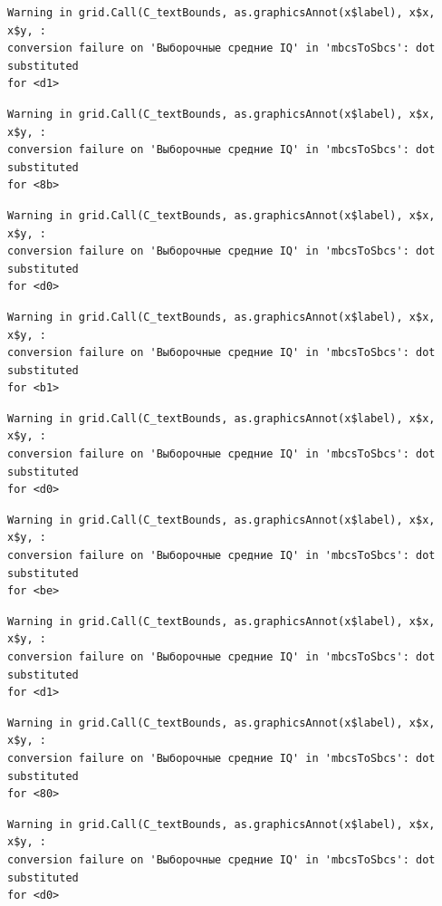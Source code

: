 \documentclass[
  letterpaper,
  DIV=11,
  numbers=noendperiod]{scrreprt}
\theoremstyle{definition}
\theoremstyle{remark}
\begin{document}
\begin{verbatim}
Warning in grid.Call(C_textBounds, as.graphicsAnnot(x$label), x$x, x$y, :
conversion failure on 'Выборочные средние IQ' in 'mbcsToSbcs': dot substituted
for <d1>
\end{verbatim}

\begin{verbatim}
Warning in grid.Call(C_textBounds, as.graphicsAnnot(x$label), x$x, x$y, :
conversion failure on 'Выборочные средние IQ' in 'mbcsToSbcs': dot substituted
for <8b>
\end{verbatim}

\begin{verbatim}
Warning in grid.Call(C_textBounds, as.graphicsAnnot(x$label), x$x, x$y, :
conversion failure on 'Выборочные средние IQ' in 'mbcsToSbcs': dot substituted
for <d0>
\end{verbatim}

\begin{verbatim}
Warning in grid.Call(C_textBounds, as.graphicsAnnot(x$label), x$x, x$y, :
conversion failure on 'Выборочные средние IQ' in 'mbcsToSbcs': dot substituted
for <b1>
\end{verbatim}

\begin{verbatim}
Warning in grid.Call(C_textBounds, as.graphicsAnnot(x$label), x$x, x$y, :
conversion failure on 'Выборочные средние IQ' in 'mbcsToSbcs': dot substituted
for <d0>
\end{verbatim}

\begin{verbatim}
Warning in grid.Call(C_textBounds, as.graphicsAnnot(x$label), x$x, x$y, :
conversion failure on 'Выборочные средние IQ' in 'mbcsToSbcs': dot substituted
for <be>
\end{verbatim}

\begin{verbatim}
Warning in grid.Call(C_textBounds, as.graphicsAnnot(x$label), x$x, x$y, :
conversion failure on 'Выборочные средние IQ' in 'mbcsToSbcs': dot substituted
for <d1>
\end{verbatim}

\begin{verbatim}
Warning in grid.Call(C_textBounds, as.graphicsAnnot(x$label), x$x, x$y, :
conversion failure on 'Выборочные средние IQ' in 'mbcsToSbcs': dot substituted
for <80>
\end{verbatim}

\begin{verbatim}
Warning in grid.Call(C_textBounds, as.graphicsAnnot(x$label), x$x, x$y, :
conversion failure on 'Выборочные средние IQ' in 'mbcsToSbcs': dot substituted
for <d0>
\end{verbatim}
\end{document}
